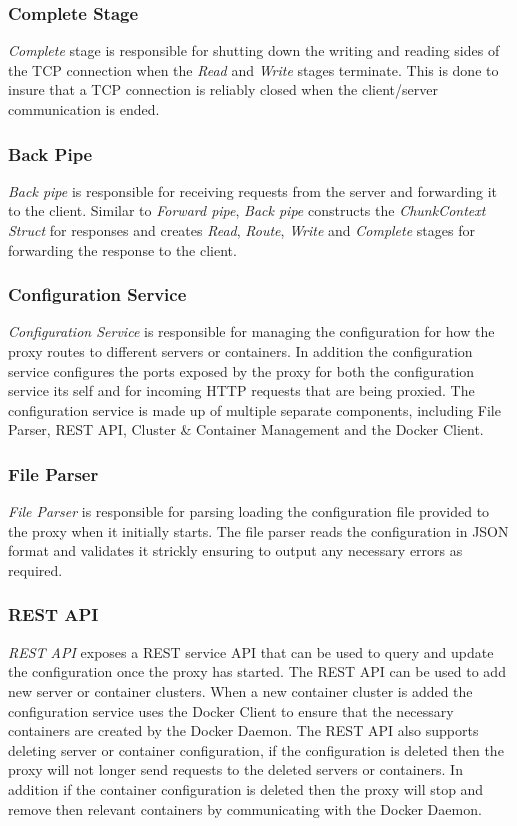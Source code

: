 \documentclass[a4paper,11pt,twoside]{report}
\begin{document}
\subsubsection*{Complete Stage}
\textit{Complete} stage is responsible for shutting down the writing and reading sides of the TCP connection when the \textit{Read} and \textit{Write} stages terminate. This is done to insure that a TCP connection is reliably closed when the client/server communication is ended. 

\subsubsection*{Back Pipe}
\textit{Back pipe} is responsible for receiving requests from the server and forwarding it to the client. Similar to \textit{Forward pipe}, \textit{Back pipe} constructs the \textit{ChunkContext Struct} for responses and creates \textit{Read}, \textit{Route}, \textit{Write} and \textit{Complete} stages for forwarding the response to the client.

\subsubsection*{Configuration Service}
\textit{Configuration Service} is responsible for managing the configuration for how the proxy routes to different servers or containers.  In addition the configuration service configures the ports exposed by the proxy for both the configuration service its self and for incoming HTTP requests that are being proxied.  The configuration service is made up of multiple separate components, including File Parser, REST API, Cluster \& Container Management and the Docker Client.

\subsubsection*{File Parser}
\textit{File Parser} is responsible for parsing loading the configuration file provided to the proxy when it initially starts.  The file parser reads the configuration in JSON format and validates it strickly ensuring to output any necessary errors as required.

\subsubsection*{REST API}
\textit{REST API} exposes a REST service API that can be used to query and update the configuration once the proxy has started.  The REST API can be used to add new server or container clusters.  When a new container cluster is added the configuration service uses the Docker Client to ensure that the necessary containers are created by the Docker Daemon.  The REST API also supports deleting server or container configuration, if the configuration is deleted then the proxy will not longer send requests to the deleted servers or containers.  In addition if the container configuration is deleted then the proxy will stop and remove then relevant containers by communicating with the Docker Daemon.
\end{document}
